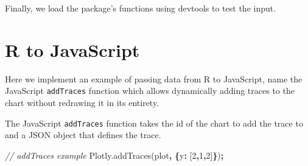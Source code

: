 \documentclass[
]{krantz}
\makeatletter
\newenvironment{Shaded}{\begin{snugshade}}{\end{snugshade}}
\newcommand{\AttributeTok}[1]{\textcolor[rgb]{0.61,0.61,0.61}{#1}}
\newcommand{\CommentTok}[1]{\textcolor[rgb]{0.37,0.37,0.37}{\textit{#1}}}
\newcommand{\ControlFlowTok}[1]{\textcolor[rgb]{0.27,0.27,0.27}{\textbf{#1}}}
\newcommand{\DataTypeTok}[1]{\textcolor[rgb]{0.27,0.27,0.27}{#1}}
\newcommand{\DecValTok}[1]{\textcolor[rgb]{0.06,0.06,0.06}{#1}}
\newcommand{\KeywordTok}[1]{\textcolor[rgb]{0.27,0.27,0.27}{\textbf{#1}}}
\newcommand{\NormalTok}[1]{#1}
\newcommand{\OperatorTok}[1]{\textcolor[rgb]{0.43,0.43,0.43}{\textbf{#1}}}
\newcommand{\StringTok}[1]{\textcolor[rgb]{0.5,0.5,0.5}{#1}}
\newcommand{\VariableTok}[1]{\textcolor[rgb]{0,0,0}{#1}}
\newenvironment{kframe}{%
\medskip{}
\setlength{\fboxsep}{.8em}
 \def\at@end@of@kframe{}%
 \ifinner\ifhmode%
  \def\at@end@of@kframe{\end{minipage}}%
  \begin{minipage}{\columnwidth}%
 \fi\fi%
 \def\FrameCommand##1{\hskip\@totalleftmargin \hskip-\fboxsep
 \colorbox{shadecolor}{##1}\hskip-\fboxsep
     \hskip-\linewidth \hskip-\@totalleftmargin \hskip\columnwidth}%
 \MakeFramed {\advance\hsize-\width
   \@totalleftmargin\z@ \linewidth\hsize
   \@setminipage}}%
 {\par\unskip\endMakeFramed%
 \at@end@of@kframe}
\renewenvironment{Shaded}{\begin{kframe}}{\end{kframe}}
\makeatother
\begin{document}
Finally, we load the package's functions using devtools to test the input.

\begin{Shaded}
\end{Shaded}

\hypertarget{r-to-javascript}{%
\section{R to JavaScript}\label{r-to-javascript}}

Here we implement an example of passing data from R to JavaScript, name the JavaScript \texttt{addTraces} function which allows dynamically adding traces to the chart without redrawing it in its entirety.

The JavaScript \texttt{addTraces} function takes the id of the chart to add the trace to and a JSON object that defines the trace.

\begin{Shaded}
\begin{Highlighting}[]
\CommentTok{// addTraces example}
\VariableTok{Plotly}\NormalTok{.}\AttributeTok{addTraces}\NormalTok{(}\StringTok{\textquotesingle{}plot\textquotesingle{}}\OperatorTok{,} \OperatorTok{\{}\DataTypeTok{y}\OperatorTok{:}\NormalTok{ [}\DecValTok{2}\OperatorTok{,}\DecValTok{1}\OperatorTok{,}\DecValTok{2}\NormalTok{]}\OperatorTok{\}}\NormalTok{)}\OperatorTok{;}
\end{Highlighting}
\end{Shaded}
\end{document}
